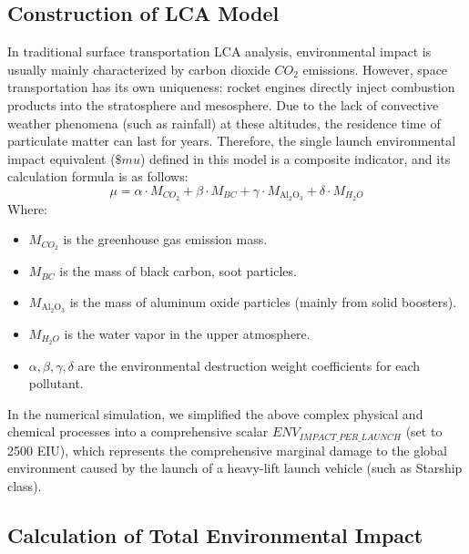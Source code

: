 \subsection{Construction of LCA Model}
In traditional surface transportation LCA analysis, environmental impact is usually mainly characterized by carbon dioxide $CO_2$ emissions.
However, space transportation has its own uniqueness: rocket engines directly inject combustion products into the stratosphere and mesosphere.
Due to the lack of convective weather phenomena (such as rainfall) at these altitudes, the residence time of particulate matter can last for years.
Therefore, the single launch environmental impact equivalent ($\$mu $) defined in this model is a composite indicator, and its calculation formula is as follows:
\[\mu=\alpha\cdot M_{CO_2}+\beta\cdot M_{BC}+\gamma\cdot M_{\mathrm{Al_2O_3}}+\delta\cdot M_{H_2O}\]
\indent Where:
\begin{itemize}
\item $M_{CO_2}$ is the greenhouse gas emission mass.
\item $M_{BC}$ is the mass of black carbon, soot particles.
\item $M_{\mathrm{Al_2O_3}}$ is the mass of aluminum oxide particles (mainly from solid boosters).
\item $M_{H_2O}$ is the water vapor in the upper atmosphere.
\item $\alpha,\beta,\gamma,\delta$ are the environmental destruction weight coefficients for each pollutant.
\end{itemize}

In the numerical simulation, we simplified the above complex physical and chemical processes into a comprehensive scalar $ENV_{IMPACT\_PER\_LAUNCH}$ (set to 2500 EIU), which represents the comprehensive marginal damage to the global environment caused by the launch of a heavy-lift launch vehicle (such as Starship class).
\subsection{Calculation of Total Environmental Impact}
